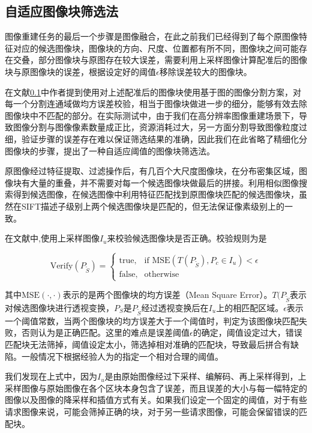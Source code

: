 \documentclass[UTF8]{csoarticle}
\begin{document}
\subsection{自适应图像块筛选法}
图像重建任务的最后一个步骤是图像融合，在此之前我们已经得到了每个原图像特征对应的候选图像块，图像块的方向、尺度、位置都有所不同，图像块之间可能存在交叠，部分图像块与原图存在较大误差，需要利用上采样图像计算配准后的图像块与原图像块的误差，根据设定好的阈值\(\epsilon\)移除误差较大的图像块。

在文献\ref{}中作者提到使用对上述配准后的图像块使用基于图的图像分割方案，对每一个分割连通域做均方误差校验，相当于图像块做进一步的细分，能够有效去除图像块中不匹配的部分。在实际测试中，由于我们在高分辨率图像重建场景下，导致图像分割与图像像素数量成正比，资源消耗过大，另一方面分割导致图像粒度过细，验证步骤的误差存在难以保证筛选结果的准确，因此我们在此省略了精细化分图像块的步骤，提出了一种自适应阈值的图像块筛选法。

原图像经过特征提取、过滤操作后，有几百个大尺度图像块，在分布密集区域，图像块有大量的重叠，并不需要对每一个候选图像块做最后的拼接。利用相似图像搜索得到候选图像，在候选图像中利用特征匹配找到原图像块匹配的候选图像块，虽然在SIFT描述子级别上两个候选图像块是匹配的，但无法保证像素级别上的一致。

在文献\cite{bib1}中,使用上采样图像\(I_u\)来校验候选图像块是否正确。校验规则为是

\begin{equation}
  \text{Verify}(P_{\tilde{S}}) = 
\begin{cases} 
\text{true}, & \mbox{if MSE} (T(P_{\tilde{S}}),P_c \in I_u) < \epsilon \\
\text{false}, & \mbox{otherwise}
\end{cases}
\end{equation}

其中\(\text{MSE}(\cdot,\cdot)\)表示的是两个图像块的均方误差（Mean Square Error）。\(T(P_{\tilde{S}}\)表示对候选图像块进行透视变换，\(P_{S}\)是\(P_{\tilde{S}}\)经过透视变换后在\(I_u\)上的相匹配区域。\(\epsilon\)表示一个阈值常数，当两个图像块的均方误差大于一个阈值时，判定为该图像块匹配失败，否则认为是正确匹配。这里的难点是误差阈值\(\epsilon\)的确定，阈值设定过大，错误匹配块无法筛掉，阈值设定太小，筛选掉相对准确的匹配块，导致最后拼合有缺陷。一般情况下根据经验人为的指定一个相对合理的阈值。

我们发现在上式中，因为\(I_u\)是由原始图像经过下采样、编解码、再上采样得到，上采样图像与原始图像在各个区块本身包含了误差，而且误差的大小与每一幅特定的图像以及图像的降采样和插值方式有关。如果我们设定一个固定的阈值，对于有些请求图像来说，可能会筛掉正确的块，对于另一些请求图像，可能会保留错误的匹配块。
\end{document}
